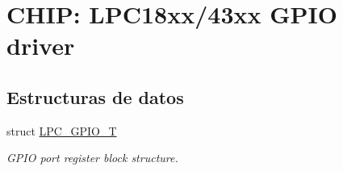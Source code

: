 \hypertarget{group___g_p_i_o__18_x_x__43_x_x}{}\section{C\+H\+IP\+: L\+P\+C18xx/43xx G\+P\+IO driver}
\label{group___g_p_i_o__18_x_x__43_x_x}
\subsection*{Estructuras de datos}
\begin{DoxyCompactItemize}
\item 
struct \hyperlink{struct_l_p_c___g_p_i_o___t}{L\+P\+C\+\_\+\+G\+P\+I\+O\+\_\+T}
\begin{DoxyCompactList}\small\item\em G\+P\+IO port register block structure. \end{DoxyCompactList}\end{DoxyCompactItemize}
